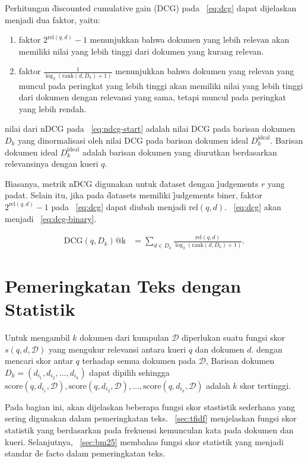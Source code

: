         Perhitungan \f{discounted cumulative gain} (DCG) pada \equ~\ref{eq:dcg} dapat dijelaskan menjadi dua faktor, yaitu:
        \begin{enumerate}
            \item faktor $2^{\text{rel}(q, d)} - 1$ menunjukkan bahwa dokumen yang lebih relevan akan memiliki nilai yang lebih tinggi dari dokumen yang kurang relevan.
            \item faktor $\frac{1}{\log_2(\text{rank}(d, D_k) + 1)}$ menunjukkan bahwa dokumen yang relevan yang muncul pada peringkat yang lebih tinggi akan memiliki nilai yang lebih tinggi dari dokumen dengan relevansi yang sama, tetapi muncul pada peringkat yang lebih rendah.
        \end{enumerate}

        nilai dari nDCG pada \equ~\ref{eq:ndcg-start} adalah nilai DCG pada barisan dokumen $D_k$ yang dinormalisasi oleh nilai DCG pada barisan dokumen ideal $D_k^{\text{ideal}}$. Barisan dokumen ideal $D_k^{\text{ideal}}$ adalah barisan dokumen yang diurutkan berdasarkan relevansinya dengan kueri $q$.

        Biasanya, metrik nDCG digunakan untuk \f{dataset} dengan \f{judgements} $r$ yang padat. Selain itu, jika pada \f{datasets} memiliki \f{judgements} biner, faktor $2^{\text{rel}(q, d)} - 1$ pada \equ~\ref{eq:dcg} dapat diubah menjadi $\text{rel}(q, d)$. \equ~\ref{eq:dcg} akan menjadi \equ~\ref{eq:dcg-binary}.
        
        \begin{align}
        \label{eq:dcg-binary}
        \text{DCG}(q, D_k)\text{@k} &= \sum_{d \in D_k} \frac{\text{rel}(q, d)}{\log_2(\text{rank}(d, D_k) + 1)}.
        \end{align}


\section{Pemeringkatan Teks dengan Statistik}
        Untuk mengambil $k$ dokumen dari kumpulan $\mathcal{D}$ diperlukan suatu fungsi skor $s(q, d, \mathcal{D})$ yang mengukur relevansi antara kueri $q$ dan dokumen $d$. dengan mencari skor antar $q$ terhadap semua dokumen pada $\mathcal{D}$, Barisan dokumen $D_k = (d_{i_1}, d_{i_2},\dots, d_{i_k})$ dapat dipilih sehingga $\text{score}(q, d_{i_1},\mathcal{D}), \text{score}(q, d_{i_2},\mathcal{D}), \dots, \text{score}(q, d_{i_k},\mathcal{D})$ adalah $k$ skor tertinggi.
        
        Pada bagian ini, akan dijelaskan beberapa fungsi skor stastistik sederhana yang sering digunakan dalam pemeringkatan teks. \sect~\ref{sec:tfidf} menjelaskan fungsi skor statistik yang berdasarkan pada frekuensi kemunculan kata pada dokumen dan kueri. Selanjutnya, \sect~\ref{sec:bm25} membahas fungsi skor statistik yang menjadi standar \f{de facto} dalam pemeringkatan teks.


